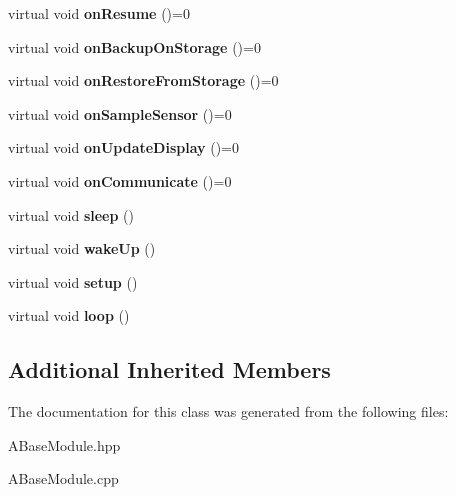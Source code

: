 \begin{DoxyCompactItemize}
$$virtual void {\bfseries on\+Resume} ()=0
\item 
\mbox{\label{classwood_box_1_1module_1_1_a_base_module_aa0268bd48301ed644746df81be6d1e87}} 
virtual void {\bfseries on\+Backup\+On\+Storage} ()=0
\item 
\mbox{\label{classwood_box_1_1module_1_1_a_base_module_ae76a5f1f710290ea8d52204b38bcf0b2}} 
virtual void {\bfseries on\+Restore\+From\+Storage} ()=0
\item 
\mbox{\label{classwood_box_1_1module_1_1_a_base_module_ae66d1335fad9124b249d406734250adb}} 
virtual void {\bfseries on\+Sample\+Sensor} ()=0
\item 
\mbox{\label{classwood_box_1_1module_1_1_a_base_module_a77650bd8b4d90882a59d35b8d187db04}} 
virtual void {\bfseries on\+Update\+Display} ()=0
\item 
\mbox{\label{classwood_box_1_1module_1_1_a_base_module_a8ea3cf7772b85e3102a4e81ada7cf830}} 
virtual void {\bfseries on\+Communicate} ()=0
\item 
\mbox{\label{classwood_box_1_1module_1_1_a_base_module_a1af76b5b3b49af1f2feb1624ac64d535}} 
virtual void {\bfseries sleep} ()
\item 
\mbox{\label{classwood_box_1_1module_1_1_a_base_module_a39051c62edae6df5b6c6a167e0408d50}} 
virtual void {\bfseries wake\+Up} ()
\item 
\mbox{\label{classwood_box_1_1module_1_1_a_base_module_aa6bec11f1eca540ea055d14f6207bc7a}} 
virtual void {\bfseries setup} ()
\item 
\mbox{\label{classwood_box_1_1module_1_1_a_base_module_ad834c5039de920a07bc946775bbd0d28}} 
virtual void {\bfseries loop} ()
\end{DoxyCompactItemize}
\subsection*{Additional Inherited Members}


The documentation for this class was generated from the following files\+:\begin{DoxyCompactItemize}
\item 
A\+Base\+Module.\+hpp\item 
A\+Base\+Module.\+cpp\end{DoxyCompactItemize}
